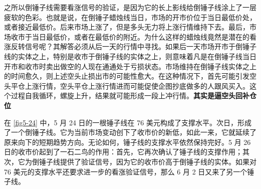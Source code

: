 之所以倒锤子线需要看涨信号的验证，是因为它的长上影线给倒锤子线涂上了一层疲软的色彩。也就是说，在倒锤子蜡烛线当日，市场的开市价位于当日最低价处，或者接近最低价。后来市场上涨了，但是多头无力将上涨行情维持下去。最后，市场收市于当日最低价，或者在最低价的附近。为什么这样的蜡烛线竟然是潜在的看涨反转信号呢？其解答必须从后一天的行情中寻找。如果后一天市场开市于倒锤子线的实体之上，特别是收市于倒锤子线的实体之上，则意味着凡是在倒锤子线当日开市和收市时卖出做空的人现在通通处于亏损状态。市场维持在倒锤子线实体之上的时间愈久，则上述空头止损出市的可能性愈大。在这种情况下，首先可能引发空头平仓上涨行情，空头平仓上涨行情进而可能促使企图抄底做多的人跟风买入。这个过程自我循环，螺旋上升，结果就可能形成一段上冲行情。\textbf{其实是逼空头回补仓位}


在 \autoref{fig5-24} 中，5 月 24 日的一根锤子线在 76 美元构成了支撑水平。次日，形成了一个倒锤子线。它为当前市场变动创下了收市价的新低，如此一来，它就延续了原来向下的短期趋势方向。无论如何，锤子线的支撑水平依然保持完好。5 月 26 日的收市价起到了一石二鸟的作用：首先，它再次确认了锤子线的支撑作用；其次，它为倒锤子线提供了验证信号，因为它的收市价高于倒锤子线的实体。如果对 76 美元的支撑水平还要求进一步的看涨验证信号，那么 6 月 2 日又来了另一个锤子线。

